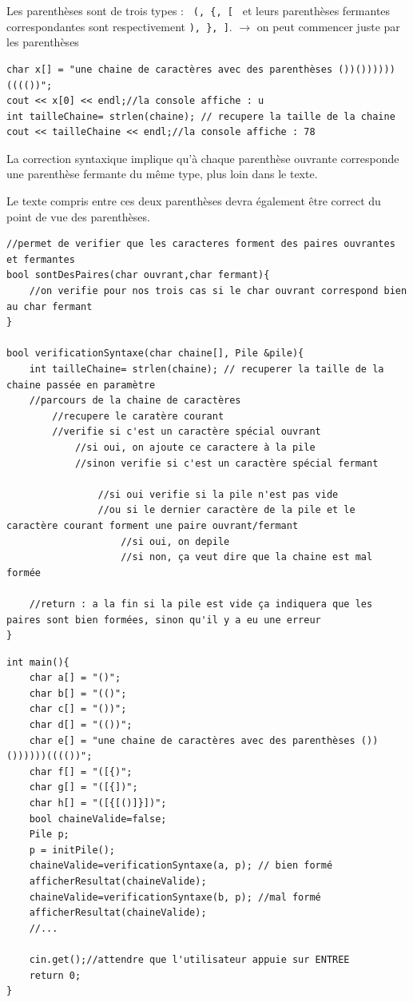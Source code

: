 \documentclass[french]{article}
\begin{document}
Les parenthèses sont de trois types : \texttt{ (, \{, [ } et leurs parenthèses fermantes correspondantes sont respectivement \texttt{), \}, ]}.
$\rightarrow$ on peut commencer juste par les parenthèses
\begin{lstlisting}[caption={Rappel : Déclaration d'une chaîne de caractères},label=stringrappel]
char x[] = "une chaine de caractères avec des parenthèses ())())))))(((())";
cout << x[0] << endl;//la console affiche : u
int tailleChaine= strlen(chaine); // recupere la taille de la chaine
cout << tailleChaine << endl;//la console affiche : 78
\end{lstlisting}

La correction syntaxique implique qu’à chaque parenthèse ouvrante corresponde une parenthèse fermante du même type, plus loin dans le texte.


Le texte compris entre ces deux parenthèses devra également être correct du point de vue des parenthèses.

\begin{lstlisting}[caption={Aide pour Verification syntaxe},label=aide]
//permet de verifier que les caracteres forment des paires ouvrantes et fermantes
bool sontDesPaires(char ouvrant,char fermant){
    //on verifie pour nos trois cas si le char ouvrant correspond bien au char fermant
}

bool verificationSyntaxe(char chaine[], Pile &pile){
    int tailleChaine= strlen(chaine); // recuperer la taille de la chaine passée en paramètre
    //parcours de la chaine de caractères
        //recupere le caratère courant
        //verifie si c'est un caractère spécial ouvrant
            //si oui, on ajoute ce caractere à la pile
            //sinon verifie si c'est un caractère spécial fermant
        
                //si oui verifie si la pile n'est pas vide
                //ou si le dernier caractère de la pile et le caractère courant forment une paire ouvrant/fermant
                    //si oui, on depile
                    //si non, ça veut dire que la chaine est mal formée
        
    //return : a la fin si la pile est vide ça indiquera que les paires sont bien formées, sinon qu'il y a eu une erreur
}
\end{lstlisting}

\begin{lstlisting}[caption={Exemple de main pour verifier la syntaxe},label=main]
int main(){
    char a[] = "()";
    char b[] = "(()";
    char c[] = "())";
    char d[] = "(())";
    char e[] = "une chaine de caractères avec des parenthèses ())())))))(((())";
    char f[] = "([{)";
    char g[] = "([{])";
    char h[] = "([{[()]}])";
    bool chaineValide=false;
    Pile p;
    p = initPile();
    chaineValide=verificationSyntaxe(a, p); // bien formé
    afficherResultat(chaineValide);
    chaineValide=verificationSyntaxe(b, p); //mal formé
    afficherResultat(chaineValide);
    //...
    
    cin.get();//attendre que l'utilisateur appuie sur ENTREE
    return 0;
}
\end{lstlisting}
\end{document}
